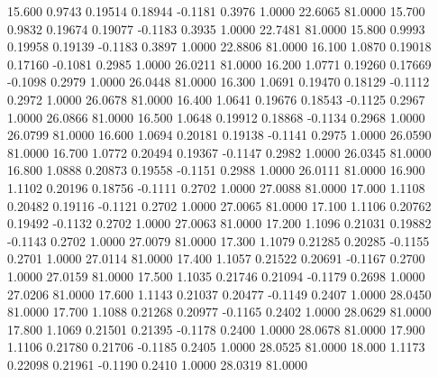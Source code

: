   15.600   0.9743   0.19514   0.18944  -0.1181   0.3976   1.0000  22.6065  81.0000
  15.700   0.9832   0.19674   0.19077  -0.1183   0.3935   1.0000  22.7481  81.0000
  15.800   0.9993   0.19958   0.19139  -0.1183   0.3897   1.0000  22.8806  81.0000
  16.100   1.0870   0.19018   0.17160  -0.1081   0.2985   1.0000  26.0211  81.0000
  16.200   1.0771   0.19260   0.17669  -0.1098   0.2979   1.0000  26.0448  81.0000
  16.300   1.0691   0.19470   0.18129  -0.1112   0.2972   1.0000  26.0678  81.0000
  16.400   1.0641   0.19676   0.18543  -0.1125   0.2967   1.0000  26.0866  81.0000
  16.500   1.0648   0.19912   0.18868  -0.1134   0.2968   1.0000  26.0799  81.0000
  16.600   1.0694   0.20181   0.19138  -0.1141   0.2975   1.0000  26.0590  81.0000
  16.700   1.0772   0.20494   0.19367  -0.1147   0.2982   1.0000  26.0345  81.0000
  16.800   1.0888   0.20873   0.19558  -0.1151   0.2988   1.0000  26.0111  81.0000
  16.900   1.1102   0.20196   0.18756  -0.1111   0.2702   1.0000  27.0088  81.0000
  17.000   1.1108   0.20482   0.19116  -0.1121   0.2702   1.0000  27.0065  81.0000
  17.100   1.1106   0.20762   0.19492  -0.1132   0.2702   1.0000  27.0063  81.0000
  17.200   1.1096   0.21031   0.19882  -0.1143   0.2702   1.0000  27.0079  81.0000
  17.300   1.1079   0.21285   0.20285  -0.1155   0.2701   1.0000  27.0114  81.0000
  17.400   1.1057   0.21522   0.20691  -0.1167   0.2700   1.0000  27.0159  81.0000
  17.500   1.1035   0.21746   0.21094  -0.1179   0.2698   1.0000  27.0206  81.0000
  17.600   1.1143   0.21037   0.20477  -0.1149   0.2407   1.0000  28.0450  81.0000
  17.700   1.1088   0.21268   0.20977  -0.1165   0.2402   1.0000  28.0629  81.0000
  17.800   1.1069   0.21501   0.21395  -0.1178   0.2400   1.0000  28.0678  81.0000
  17.900   1.1106   0.21780   0.21706  -0.1185   0.2405   1.0000  28.0525  81.0000
  18.000   1.1173   0.22098   0.21961  -0.1190   0.2410   1.0000  28.0319  81.0000
